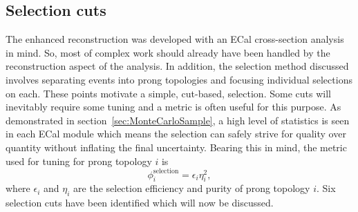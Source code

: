 \subsection{Selection cuts}
\label{subsec:SelectionCuts}
The enhanced reconstruction was developed with an ECal cross-section analysis in mind.  So, most of complex work should already have been handled by the reconstruction aspect of the analysis.  In addition, the selection method discussed involves separating events into prong topologies and focusing individual selections on each.  These points motivate a simple, cut-based, selection.  Some cuts will inevitably require some tuning and a metric is often useful for this purpose.  As demonstrated in section~\ref{sec:MonteCarloSample}, a high level of statistics is seen in each ECal module which means the selection can safely strive for quality over quantity without inflating the final uncertainty.  Bearing this in mind, the metric used for tuning for prong topology $i$ is
\begin{equation}
  \phi_i^{\textrm{selection}} = \epsilon_i\eta^2_i,
  \label{eqn:SelectionMetric}
\end{equation}
where $\epsilon_i$ and $\eta_i$ are the selection efficiency and purity of prong topology $i$.  Six selection cuts have been identified which will now be discussed. 

